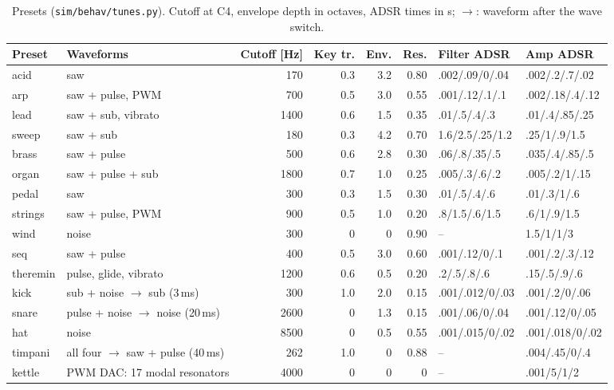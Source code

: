 \documentclass[11pt,a4paper]{article}
\newcommand{\file}[1]{\texttt{#1}}
\begin{document}
\begin{table}[h]
\centering\footnotesize
\caption{Presets (\file{sim/behav/tunes.py}). Cutoff at C4, envelope depth in octaves, ADSR times in s;
$\to$: waveform after the wave switch.}\label{tab:presets}
\setlength{\tabcolsep}{3.5pt}
\begin{tabular}{@{}l l r r r r l l@{}}
\toprule
Preset & Waveforms & Cutoff [Hz] & Key tr. & Env. & Res. & Filter ADSR & Amp ADSR \\
\midrule
acid & saw & 170 & 0.3 & 3.2 & 0.80 & .002/.09/0/.04 & .002/.2/.7/.02 \\
arp & saw + pulse, PWM & 700 & 0.5 & 3.0 & 0.55 & .001/.12/.1/.1 & .002/.18/.4/.12 \\
lead & saw + sub, vibrato & 1400 & 0.6 & 1.5 & 0.35 & .01/.5/.4/.3 & .01/.4/.85/.25 \\
sweep & saw + sub & 180 & 0.3 & 4.2 & 0.70 & 1.6/2.5/.25/1.2 & .25/1/.9/1.5 \\
brass & saw + pulse & 500 & 0.6 & 2.8 & 0.30 & .06/.8/.35/.5 & .035/.4/.85/.5 \\
organ & saw + pulse + sub & 1800 & 0.7 & 1.0 & 0.25 & .005/.3/.6/.2 & .005/.2/1/.15 \\
pedal & saw & 300 & 0.3 & 1.5 & 0.30 & .01/.5/.4/.6 & .01/.3/1/.6 \\
strings & saw + pulse, PWM & 900 & 0.5 & 1.0 & 0.20 & .8/1.5/.6/1.5 & .6/1/.9/1.5 \\
wind & noise & 300 & 0 & 0 & 0.90 & -- & 1.5/1/1/3 \\
seq & saw + pulse & 400 & 0.5 & 3.0 & 0.60 & .001/.12/0/.1 & .001/.2/.3/.12 \\
theremin & pulse, glide, vibrato & 1200 & 0.6 & 0.5 & 0.20 & .2/.5/.8/.6 & .15/.5/.9/.6 \\
\midrule
kick & sub + noise $\to$ sub (3\,ms) & 300 & 1.0 & 2.0 & 0.15 & .001/.012/0/.03 & .001/.2/0/.06 \\
snare & pulse + noise $\to$ noise (20\,ms) & 2600 & 0 & 1.3 & 0.15 & .001/.06/0/.04 & .001/.12/0/.05 \\
hat & noise & 8500 & 0 & 0.5 & 0.55 & .001/.015/0/.02 & .001/.018/0/.02 \\
timpani & all four $\to$ saw + pulse (40\,ms) & 262 & 1.0 & 0 & 0.88 & -- & .004/.45/0/.4 \\
kettle & PWM DAC: 17 modal resonators & 4000 & 0 & 0 & 0 & -- & .001/5/1/2 \\
\bottomrule
\end{tabular}
\end{table}
\end{document}
